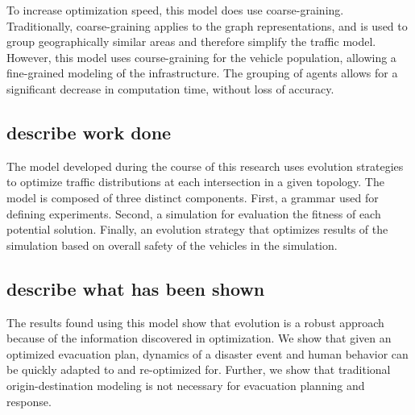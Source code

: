 \documentclass{sig-alternate-05-2015}
\begin{document}
	To increase optimization speed, this model does use coarse-graining. Traditionally, coarse-graining applies to the graph representations, and is used to group geographically similar areas and therefore simplify the traffic model. However, this model uses course-graining for the vehicle population, allowing a fine-grained modeling of the infrastructure. The grouping of agents allows for a significant decrease in computation time, without loss of accuracy. 
	
	\subsection{describe work done}
	The model developed during the course of this research uses evolution strategies to optimize traffic distributions at each intersection in a given topology. The model is composed of three distinct components. First, a grammar used for defining experiments. Second, a simulation for evaluation the fitness of each potential solution. Finally, an evolution strategy that optimizes results of the simulation based on overall safety of the vehicles in the simulation.
	
	\subsection{describe what has been shown}
	The results found using this model show that evolution is a robust approach because of the information discovered in optimization. We show that given an optimized evacuation plan, dynamics of a disaster event and human behavior can be quickly adapted to and re-optimized for. Further, we show that traditional origin-destination modeling is not necessary for evacuation planning and response.
	
\end{document}
